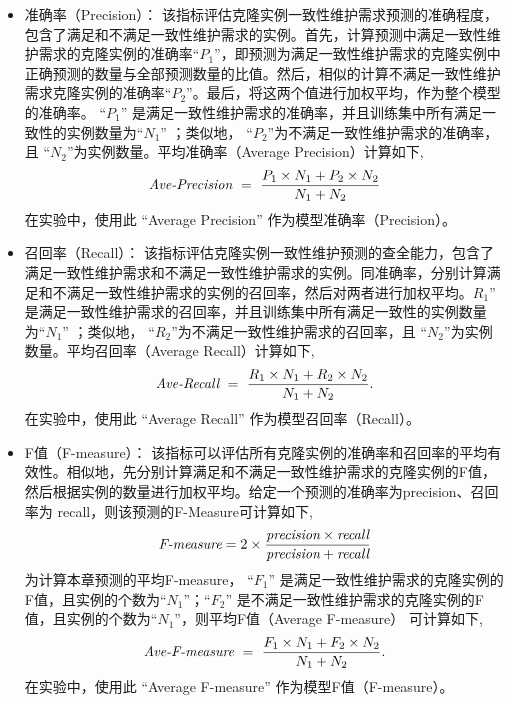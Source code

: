 \begin{itemize}
\item
{准确率（Precision）：} 该指标评估克隆实例一致性维护需求预测的准确程度，包含了满足和不满足一致性维护需求的实例。首先，计算预测中满足一致性维护需求的克隆实例的准确率``$P_1$''，即预测为满足一致性维护需求的克隆实例中正确预测的数量与全部预测数量的比值。然后，相似的计算不满足一致性维护需求克隆实例的准确率``$P_2$''。最后，将这两个值进行加权平均，作为整个模型的准确率。 ``$P_1$'' 是满足一致性维护需求的准确率，并且训练集中所有满足一致性的实例数量为``$N_1$'' ；类似地， ``$P_2$''为不满足一致性维护需求的准确率，且 ``$N_2$''为实例数量。平均准确率（Average Precision）计算如下,
\[
\mbox{\it Ave-Precision} ~=~ {\frac {P_1 \times N_1 + P_2 \times N_2}{N_1 + N_2}}
\]
在实验中，使用此 ``Average Precision'' 作为模型准确率（Precision）。


\item
{召回率（Recall）：} 该指标评估克隆实例一致性维护预测的查全能力，包含了满足一致性维护需求和不满足一致性维护需求的实例。同准确率，分别计算满足和不满足一致性维护需求的实例的召回率，然后对两者进行加权平均。$R_1$'' 是满足一致性维护需求的召回率，并且训练集中所有满足一致性的实例数量为``$N_1$'' ；类似地， ``$R_2$''为不满足一致性维护需求的召回率，且 ``$N_2$''为实例数量。平均召回率（Average Recall）计算如下,
\[
\mbox{\it Ave-Recall} ~=~ {\frac  {R_1 \times N_1 + R_2 \times N_2}{N_1 + N_2}}.
\]
在实验中，使用此 ``Average Recall'' 作为模型召回率（Recall）。

\item
{F值（F-measure）：} 该指标可以评估所有克隆实例的准确率和召回率的平均有效性。相似地，先分别计算满足和不满足一致性维护需求的克隆实例的F值，然后根据实例的数量进行加权平均。给定一个预测的准确率为precision、召回率为 recall，则该预测的F-Measure可计算如下,
\[  
\mbox{\it F-measure} =2 \times {\frac {\mbox{\it precision} \times \mbox{\it recall} }{ \mbox{\it precision} + \mbox{\it recall} } }
\]
为计算本章预测的平均F-measure， ``$F_1$'' 是满足一致性维护需求的克隆实例的F值，且实例的个数为``$N_1$''；``$F_2$'' 是不满足一致性维护需求的克隆实例的F值，且实例的个数为``$N_1$''，则平均F值（Average F-measure） 可计算如下,
\[
\mbox{\it Ave-F-measure} ~=~ {\frac  {F_1 \times N_1 + F_2 \times N_2}{N_1 + N_2}}.
\]
在实验中，使用此 ``Average F-measure'' 作为模型F值（F-measure）。
\end{itemize}

